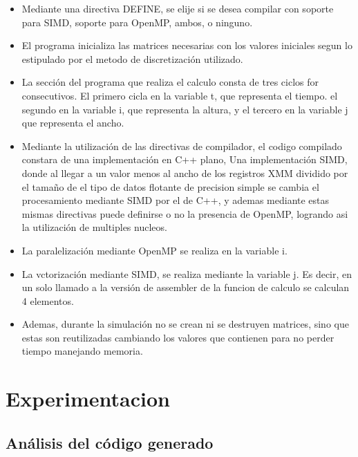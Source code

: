 \begin{itemize}
	\item Mediante una directiva DEFINE, se elije si se desea compilar con soporte para SIMD, soporte para OpenMP, ambos, o ninguno.
	\item El programa inicializa las matrices necesarias con los valores iniciales segun lo estipulado por el metodo de discretización utilizado.
	\item La sección del programa que realiza el calculo consta de tres ciclos for consecutivos. El primero cicla en la variable t, que representa el tiempo. el segundo en la variable i, que representa la altura, y el tercero en la variable j que representa el ancho.
	\item Mediante la utilización de las directivas de compilador, el codigo compilado constara de una implementación en C++ plano, Una implementación SIMD, donde al llegar a un valor menos al ancho de los registros XMM dividido por el tamaño de el tipo de datos flotante de precision simple se cambia el procesamiento mediante SIMD por el de C++, y ademas mediante estas mismas directivas puede definirse o no la presencia de OpenMP, logrando asi la utilización de multiples nucleos.

	\item La paralelización mediante OpenMP se realiza en la variable i.
	\item La vctorización mediante SIMD, se realiza mediante la variable j. Es decir, en un solo llamado a la versión de assembler de la funcion de calculo se calculan 4 elementos.

	\item Ademas, durante la simulación no se crean ni se destruyen matrices, sino que estas son reutilizadas cambiando los valores que contienen para no perder tiempo manejando memoria.
\end{itemize}

\newpage
\section{Experimentacion}

\subsection{Análisis del código generado}

